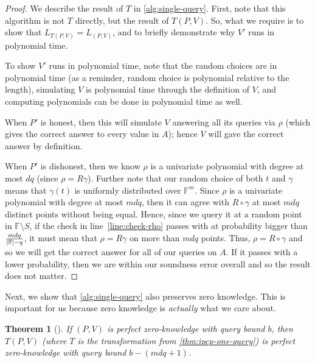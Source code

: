 \documentclass[english,12pt]{reedthesis}
\theoremstyle{plain}
\newtheorem{thm}{Theorem}[section]
\theoremstyle{definition}
\theoremstyle{remark}
\DeclarePairedDelimiter{\abs}{\lvert}{\rvert}
\begin{document}
\begin{proof}
  We describe the result of $T$ in \cref{alg:single-query}. First, note that
  this algorithm is not $T$ directly, but the result of $T(P, V)$. So, what we
  require is to show that $L_{T(P, V)} = L_{(P, V)}$, and to briefly demonstrate
  why $V'$ runs in polynomial time.

  To show $V'$ runs in polynomial time, note that the random choices are in
  polynomial time (as a reminder, random choice is polynomial relative to the
  length), simulating $V$ is polynomial time through the definition of $V$, and
  computing polynomials can be done in polynomial time as well.

  When $P'$ is honest, then this will simulate $V$ answering all its queries via
  $\rho$ (which gives the correct answer to every value in $A$); hence $V$ will
  gave the correct answer by definition.

  When $P'$ is dishonest, then we know $\rho$ is a univariate polynomial with
  degree at most $dq$ (since $\rho = R\gamma$). Further note that our random choice of
  both $t$ and $\gamma$ means that $\gamma(t)$ is uniformly distributed over
  $\mathbb{F}^{m}$. Since $\rho$ is a univariate polynomial with degree at most
  $mdq$, then it can agree with $R \circ \gamma$ at most $mdq$ distinct points without
  being equal. Hence, since we query it at a random point in $\mathbb{F} \setminus S$,
  if the check in line~\ref{line:check-rho} passes with at probability bigger
  than $\frac{mdq}{\abs{\mathbb{F}} - q}$, it must mean that $\rho = R\gamma$ on more
  than $mdq$ points. Thus, $\rho = R \circ \gamma$ and so we will get the correct answer for
  all of our queries on $A$. If it passes with a lower probability, then we are
  within our soundness error overall and so the result does not matter.
\end{proof}

Next, we show that \cref{alg:single-query} also preserves zero knowledge. This
is important for us because zero knowledge is \emph{actually} what we care
about.

\begin{thm}[{\cite[Prop.\ 9.2]{CFGS22}}]\label{thm:one-query-pzk}
  If $(P, V)$ is perfect zero-knowledge with query bound $b$, then $T(P, V)$
  (where $T$ is the transformation from \cref{thm:ipcp-one-query}) is perfect
  zero-knowledge with query bound $b - (mdq + 1)$.
\end{thm}
\end{document}
